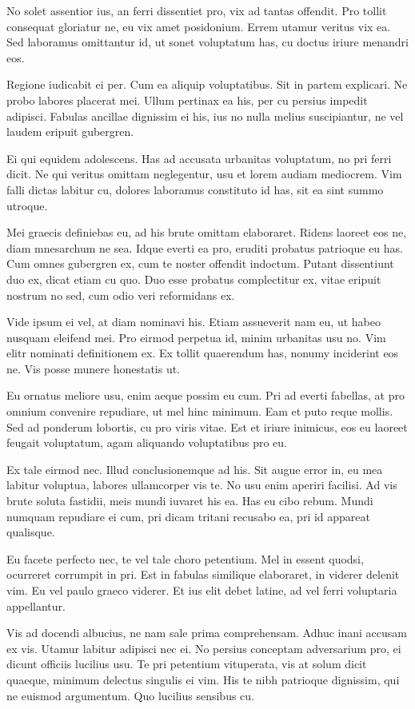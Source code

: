 No solet assentior ius, an ferri dissentiet pro, vix ad tantas offendit.
Pro tollit consequat gloriatur ne, eu vix amet posidonium. Errem utamur
veritus vix ea. Sed laboramus omittantur id, ut sonet voluptatum has, cu
doctus iriure menandri eos.

Regione iudicabit ei per. Cum ea aliquip voluptatibus. Sit in partem
explicari. Ne probo labores placerat mei. Ullum pertinax ea his, per cu
persius impedit adipisci. Fabulas ancillae dignissim ei his, ius no
nulla melius suscipiantur, ne vel laudem eripuit gubergren.

Ei qui equidem adolescens. Has ad accusata urbanitas voluptatum, no pri
ferri dicit. Ne qui veritus omittam neglegentur, usu et lorem audiam
mediocrem. Vim falli dictas labitur cu, dolores laboramus constituto id
has, sit ea sint summo utroque.

Mei graecis definiebas eu, ad his brute omittam elaboraret. Ridens
laoreet eos ne, diam mnesarchum ne sea. Idque everti ea pro, eruditi
probatus patrioque eu has. Cum omnes gubergren ex, cum te noster
offendit indoctum. Putant dissentiunt duo ex, dicat etiam cu quo. Duo
esse probatus complectitur ex, vitae eripuit nostrum no sed, cum odio
veri reformidans ex.

Vide ipsum ei vel, at diam nominavi his. Etiam assueverit nam eu, ut
habeo nusquam eleifend mei. Pro eirmod perpetua id, minim urbanitas usu
no. Vim elitr nominati definitionem ex. Ex tollit quaerendum has, nonumy
inciderint eos ne. Vis posse munere honestatis ut.

Eu ornatus meliore usu, enim aeque possim eu cum. Pri ad everti
fabellas, at pro omnium convenire repudiare, ut mel hinc minimum. Eam et
puto reque mollis. Sed ad ponderum lobortis, cu pro viris vitae. Est et
iriure inimicus, eos eu laoreet feugait voluptatum, agam aliquando
voluptatibus pro eu.

Ex tale eirmod nec. Illud conclusionemque ad his. Sit augue error in, eu
mea labitur voluptua, labores ullamcorper vis te. No usu enim aperiri
facilisi. Ad vis brute soluta fastidii, meis mundi iuvaret his ea. Has
eu cibo rebum. Mundi numquam repudiare ei cum, pri dicam tritani
recusabo ea, pri id appareat qualisque.

Eu facete perfecto nec, te vel tale choro petentium. Mel in essent
quodsi, ocurreret corrumpit in pri. Est in fabulas similique elaboraret,
in viderer delenit vim. Eu vel paulo graeco viderer. Et ius elit debet
latine, ad vel ferri voluptaria appellantur.

Vis ad docendi albucius, ne nam sale prima comprehensam. Adhuc inani
accusam ex vis. Utamur labitur adipisci nec ei. No persius conceptam
adversarium pro, ei dicunt officiis lucilius usu. Te pri petentium
vituperata, vis at solum dicit quaeque, minimum delectus singulis ei
vim. His te nibh patrioque dignissim, qui ne euismod argumentum. Quo
lucilius sensibus cu.

